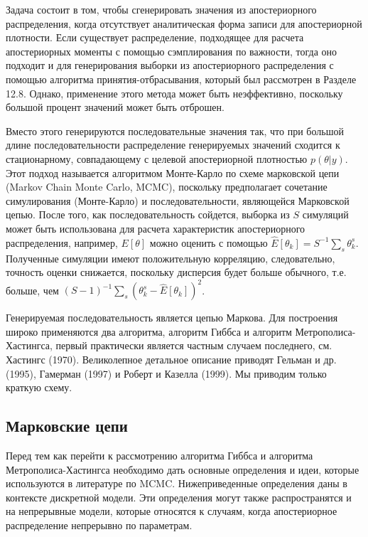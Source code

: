 Задача состоит в том, чтобы сгенерировать значения из апостериорного распределения, когда отсутствует аналитическая форма записи для апостериорной плотности. Если существует распределение, подходящее для расчета апостериорных моменты с помощью сэмплирования по важности, тогда оно подходит и для генерирования выборки из апостериорного распределения с помощью алгоритма принятия-отбрасывания, который был рассмотрен в Разделе 12.8. Однако, применение этого метода может быть неэффективно, поскольку большой процент значений может быть отброшен.

Вместо этого генерируются последовательные значения так, что при большой длине последовательности распределение  генерируемых значений сходится к стационарному, совпадающему с целевой  апостериорной плотностью $p(\theta|y)$. Этот подход называется алгоритмом Монте-Карло по схеме марковской цепи (Markov Chain Monte Carlo, MCMC), поскольку предполагает сочетание симулирования (Монте-Карло) и последовательности, являющейся Марковской цепью. После того, как последовательность сойдется, выборка из $S$ симуляций может быть использована для расчета характеристик апостериорного распределения, например, $E[\theta]$ можно оценить с помощью $\hat{E}[\theta_k]=S^{-1}\sum_{s}\theta^{s}_k$. Полученные симуляции имеют положительную корреляцию, следовательно, точность оценки снижается, поскольку дисперсия будет больше обычного, т.е. больше, чем $(S-1)^{-1}\sum_{s}(\theta^{s}_k-\hat{E}[\theta_k])^2$.

Генерируемая последовательность является цепью Маркова. Для построения широко применяются два алгоритма, алгоритм Гиббса и алгоритм Метрополиса-Хастингса, первый практически является частным случаем последнего, см. Хастингс (1970). Великолепное детальное описание приводят Гельман и др. (1995), Гамерман (1997) и Роберт и Казелла (1999). Мы приводим только краткую схему. 

\subsection{Марковские цепи}

Перед тем как перейти к рассмотрению алгоритма Гиббса и алгоритма Метрополиса-Хастингса необходимо дать основные определения и идеи, которые используются в литературе по MCMC. Нижеприведенные определения даны в контексте дискретной модели. Эти определения могут также распространятся и на непрерывные модели, которые относятся к случаям, когда апостериорное распределение непрерывно по параметрам.

